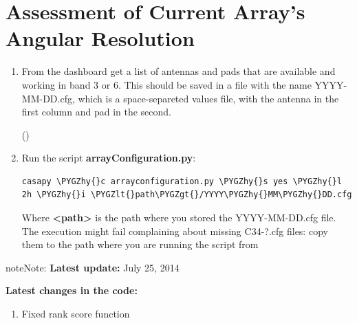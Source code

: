 \documentclass[a4paper,10pt,english]{sphinxmanual}
\def\PYGZlt{\char`\<}
\def\PYGZgt{\char`\>}
\def\PYGZhy{\char`\-}
\begin{document}
\section{Assessment of Current Array's Angular Resolution}
\label{apendix:assessment-of-current-array-s-angular-resolution}\label{apendix:current-conf}\begin{enumerate}
\item {} 
From the dashboard get a list of antennas and pads that are available and
working in band 3 or 6. This should be saved in a file with the name
YYYY-MM-DD.cfg, which is a space-separeted values file, with the antenna in the
first column and pad in the second.

()

\item {} 
Run the script \textbf{arrayConfiguration.py}:

\begin{Verbatim}[commandchars=\\\{\}]
casapy \PYGZhy{}c arrayconfiguration.py \PYGZhy{}s yes \PYGZhy{}l 2h \PYGZhy{}i \PYGZlt{}path\PYGZgt{}/YYYY\PYGZhy{}MM\PYGZhy{}DD.cfg
\end{Verbatim}

Where \textbf{\textless{}path\textgreater{}} is the path where you stored the YYYY-MM-DD.cfg file.
The execution might fail complaining about missing C34-?.cfg files: copy them
to the path where you are running the script from

\end{enumerate}

\begin{notice}{note}{Note:}
\textbf{Latest update:}
July 25, 2014

\textbf{Latest changes in the code:}
\begin{enumerate}
\item {} 
Fixed rank score function

\end{enumerate}
\end{notice}
\end{document}
